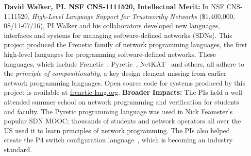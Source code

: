 \noindent
{\bf David Walker, PI. NSF CNS-1111520, Intellectual Merit:}
In NSF CNS-1111520, \emph{High-Level Language Support for Trustworthy Networks}
(\$1,400,000, 08/11-07/16),
PI Walker and his collaborators developed new languages, interfaces
and systems for managing software-defined networks (SDNs).  
This project produced the Frenetic family
of network programming languages, the first high-level languages for
programming software-defined networks.  These languages, which include
Frenetic~\cite{frenetic}, 
Pyretic~\cite{pyretic},
NetKAT~\cite{netkat} and others, all adhere to the
\emph{principle of compositionality}, a key design element missing
from earlier network programming languages.  
Open source code for systems produced by this project is available
at \url{frenetic-lang.org}.
%
{\bf Broader Impacts:} 
The PIs held a well-attended summer school on network programming and 
verification for students and faculty. The
Pyretic programming language was used in Nick Feamster's popular
SDN MOOC; thousands of students and
network operators all over the US used it to learn principles of network
programming.  The PIs
also helped create the P4 switch configuration language~\cite{P4}, which is
becoming an industry standard.

